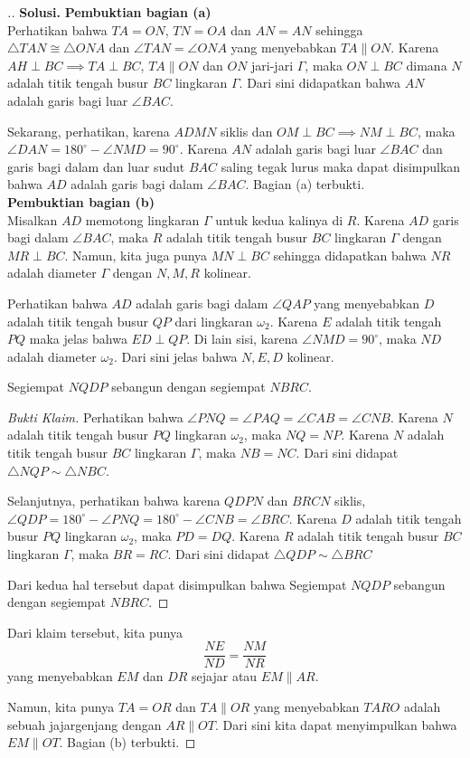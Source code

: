 \begin{proof}[.]
\newpage
\textbf{Solusi.}
\textbf{Pembuktian bagian (a)}\\
Perhatikan bahwa $TA=ON$, $TN=OA$ dan $AN=AN$ sehingga $\triangle TAN \cong \triangle ONA$ dan $\angle TAN = \angle ONA$ yang menyebabkan $TA \parallel ON$. Karena $AH \perp BC \implies TA \perp BC$, $TA \parallel ON$ dan $ON$ jari-jari $\Gamma$, maka  $ON \perp BC$ dimana $N$ adalah titik tengah busur $BC$ lingkaran $\Gamma$. Dari sini didapatkan bahwa $AN$ adalah garis bagi luar $\angle BAC$.

Sekarang, perhatikan, karena $ADMN$ siklis dan $OM \perp BC \implies NM \perp BC$, maka $\angle DAN = 180^\circ - \angle NMD = 90^\circ$. Karena $AN$ adalah garis bagi luar $\angle BAC$ dan garis bagi dalam dan luar sudut $BAC$ saling tegak lurus maka dapat disimpulkan bahwa $AD$ adalah garis bagi dalam $\angle BAC$. Bagian (a) terbukti.\\

\textbf{Pembuktian bagian (b)}\\
Misalkan $AD$ memotong lingkaran $\Gamma$ untuk kedua kalinya di $R$. Karena $AD$ garis bagi dalam $\angle BAC$, maka $R$ adalah titik tengah busur $BC$ lingkaran $\Gamma$ dengan $MR \perp BC$. Namun, kita juga punya $MN \perp BC$ sehingga didapatkan bahwa $NR$ adalah diameter $\Gamma$ dengan $N,M,R$ kolinear.

Perhatikan bahwa $AD$ adalah garis bagi dalam $\angle QAP$ yang menyebabkan $D$ adalah titik tengah busur $QP$ dari lingkaran $\omega_2$. Karena $E$ adalah titik tengah $PQ$ maka jelas bahwa $ED \perp QP$. Di lain sisi, karena $\angle NMD = 90^\circ$, maka $ND$ adalah diameter $\omega_2$. Dari sini jelas bahwa $N, E, D$ kolinear.\\

\begin{claim*}
Segiempat $NQDP$ sebangun dengan segiempat $NBRC$.
\end{claim*}
\begin{proof}[Bukti Klaim]
Perhatikan bahwa $\angle PNQ = \angle PAQ = \angle CAB = \angle CNB$. Karena $N$ adalah titik tengah busur $PQ$ lingkaran $\omega_2$, maka $NQ = NP$. Karena $N$ adalah titik tengah busur $BC$ lingkaran $\Gamma$, maka $NB = NC$. Dari sini didapat $\triangle NQP \sim \triangle NBC$. 

Selanjutnya, perhatikan bahwa karena $QDPN$ dan $BRCN$ siklis, $\angle QDP = 180^\circ - \angle PNQ = 180^\circ - \angle CNB = \angle BRC$. Karena $D$ adalah titik tengah busur $PQ$ lingkaran $\omega_2$, maka $PD=DQ$. Karena $R$ adalah titik tengah busur $BC$ lingkaran $\Gamma$, maka $BR=RC$. Dari sini didapat $\triangle QDP \sim \triangle BRC$

Dari kedua hal tersebut dapat disimpulkan bahwa Segiempat $NQDP$ sebangun dengan segiempat $NBRC$.\end{proof}

Dari klaim tersebut, kita punya 
\[\dfrac{NE}{ND} = \dfrac{NM}{NR}\]
yang menyebabkan $EM$ dan $DR$ sejajar atau $EM \parallel AR$.

Namun, kita punya $TA=OR$ dan $TA \parallel OR$ yang menyebabkan $TARO$ adalah sebuah jajargenjang dengan $AR \parallel OT$. Dari sini kita dapat menyimpulkan bahwa $EM \parallel OT$. Bagian (b) terbukti.
\end{proof}
